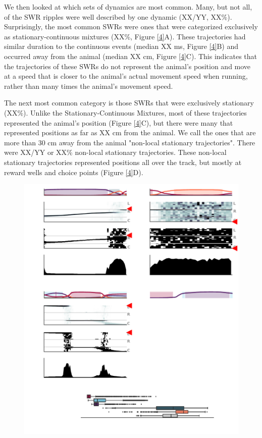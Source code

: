 \documentclass[times, twoside]{zHenriquesLab-StyleBioRxiv}
\begin{document}
We then looked at which sets of dynamics are most common. Many, but not all, of the SWR ripples were well described by one dynamic (XX/YY, XX\%). Surprisingly, the most common SWRs were ones that were categorized exclusively as stationary-continuous mixtures (XX\%, Figure \ref{4}A). These trajectories had similar duration to the continuous events (median XX ms, Figure \ref{4}B) and occurred away from the animal (median XX cm, Figure \ref{4}C). This indicates that the trajectories of these SWRs do not represent the animal's position and move at a speed that is closer to the animal's actual movement speed when running, rather than many times the animal's movement speed.

The next most common category is those SWRs that were exclusively stationary (XX\%). Unlike the Stationary-Continuous Mixtures, most of these trajectories represented the animal's position (Figure \ref{4}C), but there were many that represented positions as far as XX cm from the animal. We call the ones that are more than 30 cm away from the animal "non-local stationary trajectories". There were XX/YY or XX\% non-local stationary trajectories. These non-local stationary trajectories represented positions all over the track, but mostly at reward wells and choice points (Figure \ref{4}D). 

\begin{figure}%
\centering
\includegraphics[width=0.80\linewidth]{figures/Figure5/Figure5_v2}
\caption{}
\label{Figure5}
\end{figure}
\end{document}
